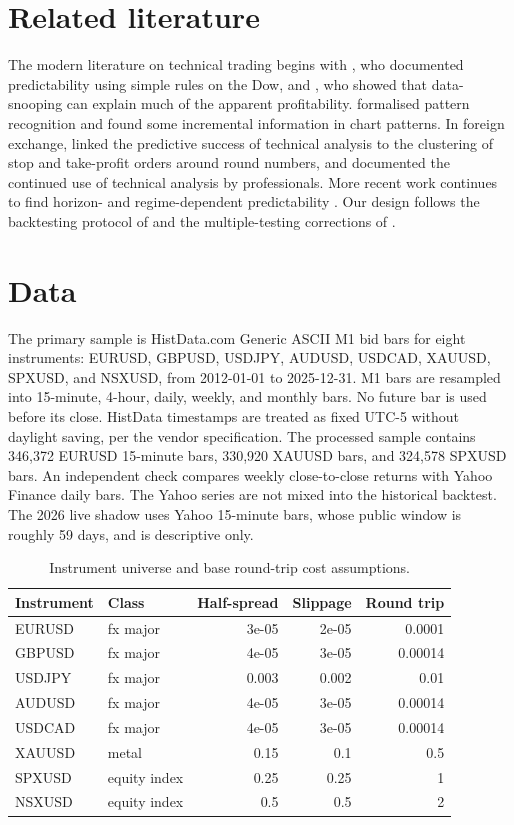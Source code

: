 \documentclass[11pt,a4paper]{article}
\begin{document}
\section{Related literature}
The modern literature on technical trading begins with \citet{brock1992simple}, who documented predictability using simple rules on the Dow, and \citet{sullivan1999data}, who showed that data-snooping can explain much of the apparent profitability. \citet{lo2000foundations} formalised pattern recognition and found some incremental information in chart patterns. In foreign exchange, \citet{osler2003currency} linked the predictive success of technical analysis to the clustering of stop and take-profit orders around round numbers, and \citet{menkhoff2007obstinate} documented the continued use of technical analysis by professionals. More recent work continues to find horizon- and regime-dependent predictability \citep{rink2023predictive,deprez2024bitcoin}. Our design follows the backtesting protocol of \citet{arnott2019backtesting} and the multiple-testing corrections of \citet{harvey2020false}.
\section{Data}
The primary sample is HistData.com Generic ASCII M1 bid bars for eight instruments: EURUSD, GBPUSD, USDJPY, AUDUSD, USDCAD, XAUUSD, SPXUSD, and NSXUSD, from 2012-01-01 to 2025-12-31. M1 bars are resampled into 15-minute, 4-hour, daily, weekly, and monthly bars. No future bar is used before its close. HistData timestamps are treated as fixed UTC-5 without daylight saving, per the vendor specification. The processed sample contains 346,372 EURUSD 15-minute bars, 330,920 XAUUSD bars, and 324,578 SPXUSD bars.
An independent check compares weekly close-to-close returns with Yahoo Finance daily bars. The Yahoo series are not mixed into the historical backtest. The 2026 live shadow uses Yahoo 15-minute bars, whose public window is roughly 59 days, and is descriptive only.
\begin{table}[htbp]\centering\small
\caption{Instrument universe and base round-trip cost assumptions.}
\label{tab:instruments}
\begin{tabular}{llrrr}
\toprule
Instrument & Class & Half-spread & Slippage & Round trip \\
\midrule
EURUSD & fx major & 3e-05 & 2e-05 & 0.0001 \\
GBPUSD & fx major & 4e-05 & 3e-05 & 0.00014 \\
USDJPY & fx major & 0.003 & 0.002 & 0.01 \\
AUDUSD & fx major & 4e-05 & 3e-05 & 0.00014 \\
USDCAD & fx major & 4e-05 & 3e-05 & 0.00014 \\
XAUUSD & metal & 0.15 & 0.1 & 0.5 \\
SPXUSD & equity index & 0.25 & 0.25 & 1 \\
NSXUSD & equity index & 0.5 & 0.5 & 2 \\
\bottomrule
\end{tabular}
\end{table}
\end{document}
